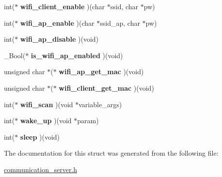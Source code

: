 \begin{DoxyCompactItemize}
\item 
int($\ast$ {\bfseries wifi\+\_\+client\+\_\+enable} )(char $\ast$ssid, char $\ast$pw)\hypertarget{structcomm__wifi_a6a1c2150c792630e3310fe096d10e026}{}\label{structcomm__wifi_a6a1c2150c792630e3310fe096d10e026}

\item 
int($\ast$ {\bfseries wifi\+\_\+ap\+\_\+enable} )(char $\ast$ssid\+\_\+ap, char $\ast$pw)\hypertarget{structcomm__wifi_a9187177234dd9a2e1b788d503779a2dd}{}\label{structcomm__wifi_a9187177234dd9a2e1b788d503779a2dd}

\item 
int($\ast$ {\bfseries wifi\+\_\+ap\+\_\+disable} )(void)\hypertarget{structcomm__wifi_ad260b706f4ca0a90485a712b389431c4}{}\label{structcomm__wifi_ad260b706f4ca0a90485a712b389431c4}

\item 
\+\_\+\+Bool($\ast$ {\bfseries is\+\_\+wifi\+\_\+ap\+\_\+enabled} )(void)\hypertarget{structcomm__wifi_af803305ffa870e0585e340a07656496c}{}\label{structcomm__wifi_af803305ffa870e0585e340a07656496c}

\item 
unsigned char $\ast$($\ast$ {\bfseries wifi\+\_\+ap\+\_\+get\+\_\+mac} )(void)\hypertarget{structcomm__wifi_ae63b415d766206849e29efcef8f32ce3}{}\label{structcomm__wifi_ae63b415d766206849e29efcef8f32ce3}

\item 
unsigned char $\ast$($\ast$ {\bfseries wifi\+\_\+client\+\_\+get\+\_\+mac} )(void)\hypertarget{structcomm__wifi_a1521dc193ab326070e52f99a6d36e6f5}{}\label{structcomm__wifi_a1521dc193ab326070e52f99a6d36e6f5}

\item 
int($\ast$ {\bfseries wifi\+\_\+scan} )(void $\ast$variable\+\_\+args)\hypertarget{structcomm__wifi_a11e04c961d47f0e3123a3d7640c6d925}{}\label{structcomm__wifi_a11e04c961d47f0e3123a3d7640c6d925}

\item 
int($\ast$ {\bfseries wake\+\_\+up} )(void $\ast$param)\hypertarget{structcomm__wifi_a9b3fd17f541d47df16a944f916a5a701}{}\label{structcomm__wifi_a9b3fd17f541d47df16a944f916a5a701}

\item 
int($\ast$ {\bfseries sleep} )(void)\hypertarget{structcomm__wifi_a027130158941ccd9ca75af19a6385f33}{}\label{structcomm__wifi_a027130158941ccd9ca75af19a6385f33}

\end{DoxyCompactItemize}


The documentation for this struct was generated from the following file\+:\begin{DoxyCompactItemize}
\item 
\hyperlink{communication__server_8h}{communication\+\_\+server.\+h}\end{DoxyCompactItemize}
